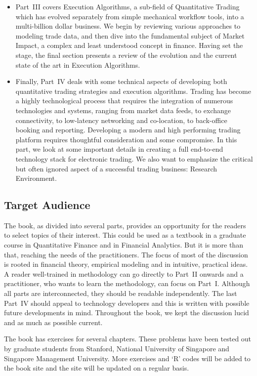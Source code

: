 \begin{itemize}
\item Part~III covers Execution Algorithms, a sub-field of Quantitative Trading which has evolved separately from simple mechanical workflow tools, into a multi-billion dollar business. We begin by reviewing various approaches to modeling trade data, and then dive into the fundamental subject of Market Impact, a complex and least understood concept in finance. Having set the stage, the final section presents a review of the evolution and the current state of the art in Execution Algorithms.

\item Finally, Part~IV deals with some technical aspects of developing both quantitative trading strategies and execution algorithms. Trading has become a highly technological process that requires the integration of numerous technologies and systems,  ranging from market data feeds, to exchange connectivity, to low-latency networking and co-location, to back-office booking and reporting. Developing a modern and high performing trading platform requires thoughtful consideration and some compromise. In this part, we look at some important details in creating a full end-to-end technology stack for electronic trading. We also want to emphasize the critical but often ignored aspect of a successful trading business: Research Environment.
\end{itemize} 


\subsection{Target Audience}

The book, as divided into several parts, provides an opportunity for the readers to select topics of their interest. This could be used as a textbook in a graduate course in Quantitative Finance and in Financial Analytics. But it is more than that, reaching the needs of the practitioners. The focus of most of the discussion is rooted in financial theory, empirical modeling and in intuitive, practical ideas. A reader well-trained in methodology can go directly to Part~II onwards and a practitioner, who wants to learn the methodology, can focus on Part~I. Although all parts are interconnected, they should be readable independently. The last Part~IV should appeal to technology developers and this is written with possible future developments in mind. Throughout the book, we kept the discussion lucid and as much as possible current. 


The book has exercises for several chapters. These problems have been tested out by graduate students from Stanford, National University of Singapore and Singapore Management University. More exercises and `R' codes will be added to the book site and the site will be updated on a regular basis. 